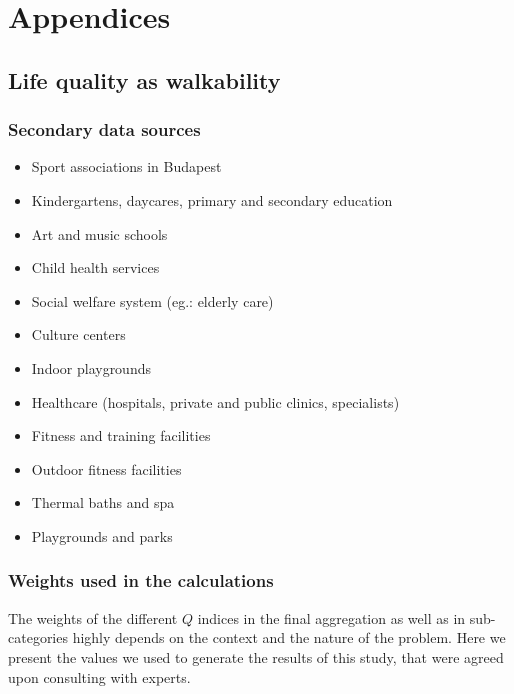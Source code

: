 \chapter{Appendices}

\section{Life quality as walkability}

\subsection{Secondary data sources}
\label{SI:walkabilityData}
\begin{itemize}
  \item {Sport associations in Budapest}~\cite{HU_sport}
  \item {Kindergartens, daycares, primary and secondary education}~\cite{HU_Edu}
  \item {Art and music schools}~\cite{HU_Art}
  \item {Child health services}~\cite{HU_Child}
  \item {Social welfare system (eg.: elderly care)}~\cite{HU_Social}
  \item {Culture centers}~\cite{HU_Cult}
  \item {Indoor playgrounds}~\cite{HU_Play}
  \item {Healthcare (hospitals, private and public clinics, specialists)}~\cite{HU_Health}
  \item {Fitness and training facilities}~\cite{HU_Fitness}
  \item {Outdoor fitness facilities}~\cite{HU_outfitness}
  \item {Thermal baths and spa}~\cite{HU_Thermal}
  \item {Playgrounds and parks}~\cite{HU_Park}
\end{itemize}

\subsection{Weights used in the calculations}
The weights of the different $Q$ indices in the final aggregation as well as in sub-categories highly depends on the context and the nature of the problem. Here we present the values we used to generate the results of this study, that were agreed upon consulting with experts.


